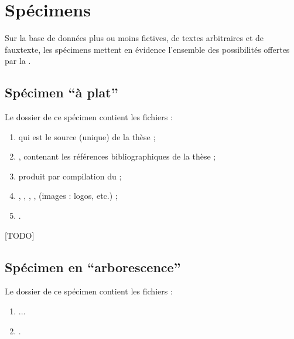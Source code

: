 
\section{Spécimens}
\label{sec-specimens}

Sur la base de données plus ou moins fictives, de textes arbitraires et de
\gls{fauxtexte}, les spécimens mettent en évidence l'ensemble des possibilités
offertes par la \yatcl{}.

\subsection[Spécimen \enquote{à plat}]{Spécimen \enquote{à plat} }
\label{sec-specimen-a-plat}

Le dossier de ce spécimen contient les fichiers :
\begin{enumerate}
\item {} qui est le source  (unique) de la thèse ;
\item {}, contenant les références bibliographiques de
  la thèse ;
\item {} produit par compilation du  ;
\item {}, , , ,
   (images : logos, etc.) ;
\item {}.
\end{enumerate}

[TODO]

\subsection[Spécimen en \enquote{arborescence}]{Spécimen en \enquote{arborescence} }
\label{sec-specimen-arborescence}

Le dossier de ce spécimen contient les fichiers :
\begin{enumerate}
\item ...
\item {}.
\end{enumerate}

